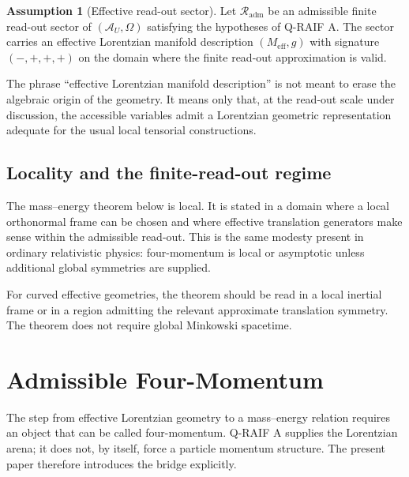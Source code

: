 \documentclass[12pt,a4paper]{article}
\theoremstyle{definition}
\newtheorem{assumption}[theorem]{Assumption}
\theoremstyle{remark}
\newcommand{\AU}{\mathcal{A}_U}
\newcommand{\Meff}{M_{\mathrm{eff}}}
\newcommand{\Omegastate}{\Omega}
\newcommand{\Rout}{\mathcal{R}_{\mathrm{adm}}}
\begin{document}
\begin{assumption}[Effective read-out sector]
\label{ass:sector}
Let $\Rout$ be an admissible finite read-out sector of $(\AU,\Omegastate)$ satisfying the hypotheses of Q-RAIF A. The sector carries an effective Lorentzian manifold description $(\Meff,g)$ with signature $(-,+,+,+)$ on the domain where the finite read-out approximation is valid.
\end{assumption}

The phrase ``effective Lorentzian manifold description'' is not meant to erase the algebraic origin of the geometry. It means only that, at the read-out scale under discussion, the accessible variables admit a Lorentzian geometric representation adequate for the usual local tensorial constructions.

\subsection{Locality and the finite-read-out regime}

The mass--energy theorem below is local. It is stated in a domain where a local orthonormal frame can be chosen and where effective translation generators make sense within the admissible read-out. This is the same modesty present in ordinary relativistic physics: four-momentum is local or asymptotic unless additional global symmetries are supplied.

For curved effective geometries, the theorem should be read in a local inertial frame or in a region admitting the relevant approximate translation symmetry. The theorem does not require global Minkowski spacetime.

\section{Admissible Four-Momentum}
\label{sec:momentum}

The step from effective Lorentzian geometry to a mass--energy relation requires an object that can be called four-momentum. Q-RAIF A supplies the Lorentzian arena; it does not, by itself, force a particle momentum structure. The present paper therefore introduces the bridge explicitly.
\end{document}
